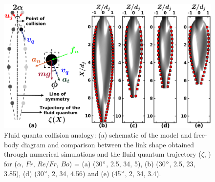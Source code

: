 \begin{figure}
    \centering
    \includegraphics[width=\linewidth]{chapters/jetJet/Figure10}
    \caption{Fluid quanta collision analogy: (a) schematic of the model and free-body diagram and comparison between the link shape obtained through numerical simulations and the fluid quantum trajectory ($\zeta$, \protect\MarkerSquareRed) for ($\alpha$, $Fr$, $Re/Fr$, $Bo$) = (a) (30$\degree$, 2.5, 34, 5), (b) (30$\degree$, 2.5, 23, 3.85), (d) (30$\degree$, 2, 34, 4.56) and (e) (45$\degree$, 2, 34, 3.4).}
    \label{Figure::analytical}
\end{figure}%
